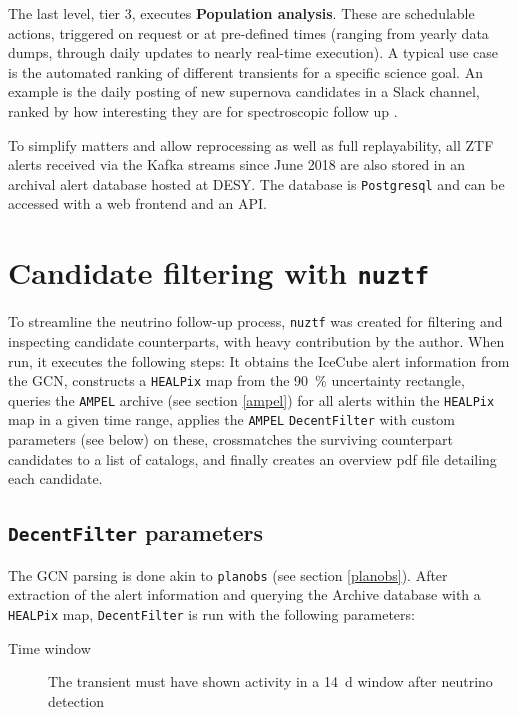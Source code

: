 \documentclass[
    a4paper, %
    fontsize=10pt, %
    twoside=true, %
    numbers=noenddot, %
    fontmethod=tex,
]{kaobook}
\begin{document}
The last level, tier 3, executes \textbf{Population analysis}. These are schedulable actions, triggered on request or at pre-defined times (ranging from yearly data dumps, through daily updates to nearly real-time execution). A typical use case is the automated ranking of different transients for a specific science goal. An example is the daily posting of new supernova candidates in a Slack channel, ranked by how interesting they are for spectroscopic follow up \cite{Nordin2019}.

To simplify matters and allow reprocessing as well as full replayability, all ZTF alerts received via the Kafka streams since June 2018 are also stored in an archival alert database hosted at DESY. The database is \texttt{Postgresql} and can be accessed with a web frontend and an API.

\section{Candidate filtering with \texttt{nuztf}}
To streamline the neutrino follow-up process, \texttt{nuztf}  was created for filtering and inspecting candidate counterparts, with heavy contribution by the author. When run, it executes the following steps: It obtains the IceCube alert information from the GCN, constructs a \texttt{HEALPix} map from the \SI{90}{\percent} uncertainty rectangle, queries the \texttt{AMPEL} archive (see section \ref{ampel}) for all alerts within the \texttt{HEALPix} map in a given time range, applies the \texttt{AMPEL} \texttt{DecentFilter} \cite{Nordin2019} with custom parameters (see below) on these, crossmatches the surviving counterpart candidates to a list of catalogs, and finally creates an overview pdf file detailing each candidate.

\subsection{\texttt{DecentFilter} parameters}
The GCN parsing is done akin to \texttt{planobs} (see section \ref{planobs}). After extraction of the alert information and querying the Archive database with a \texttt{HEALPix} map, \texttt{DecentFilter} is run with the following parameters:
\begin{description}
    \item[Time window] The transient must have shown activity in a \SI{14}{\day} window after neutrino detection
\end{description}
\end{document}
